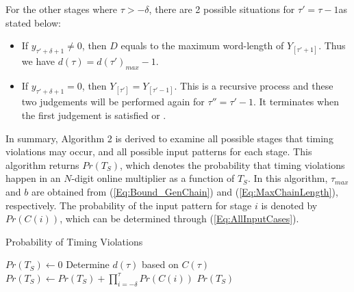 \documentclass{acm_proc_article-sp}
\begin{document}
For the other stages where $\tau>-\delta$, there are 2 possible situations for $\tau'=\tau-1$as stated below:
\vspace{-2.5ex}
\begin{itemize}
  \item If $y_{\tau'+\delta+1}\neq0$, then $D$ equals to the maximum word-length of $Y_{[\tau'+1]}$. Thus we have $d(\tau)=d(\tau')_{max}-1$.\vspace{-1ex}
  \item If $y_{\tau'+\delta+1}=0$, then $Y_{[\tau']}=Y_{[\tau'-1]}$. This is a recursive process and these two judgements will be performed again for $\tau''=\tau'-1$. It terminates when the first judgement is satisfied or .
\end{itemize}
\vspace{-1.5ex}

In summary, Algorithm 2 is derived to examine all possible stages that timing violations may occur, and all possible input patterns for each stage. This algorithm returns $Pr(T_S)$, which denotes the probability that timing violations happen in an $N$-digit online multiplier as a function of $T_S$. In this algorithm, $\tau_{max}$ and $b$ are obtained from (\ref{Eq:Bound_GenChain}) and (\ref{Eq:MaxChainLength}), respectively. The probability of the input pattern for stage $i$ is denoted by $Pr(C(i))$, which can be determined through (\ref{Eq:AllInputCases}).
%
\begin{algorithm}[htbp]
  \caption{Probability of Timing Violations}
  \begin{algorithmic}[1]
    \STATE  $Pr(T_S)\leftarrow0$
    \STATE  Determine $d(\tau)$ based on $C(\tau)$
    \STATE  $Pr(T_S)\leftarrow Pr(T_S)+\prod_{i=-\delta}^{\tau}Pr(C(i))$
    \ENDIF
    \ENDFOR
    \RETURN $Pr(T_S)$
  \label{Algorithm:ProbabilityTimingViolation}
  \end{algorithmic}
\end{algorithm}
\end{document}
